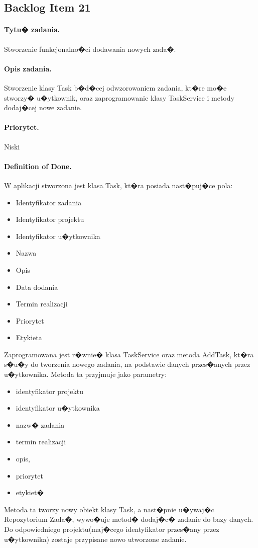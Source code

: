 ﻿\documentclass[a4paper]{article}
\begin{document}
\subsection{Backlog Item 21} 
\paragraph{Tytu� zadania.}  Stworzenie funkcjonalno�ci dodawania nowych zada�.
\paragraph{Opis zadania.} Stworzenie klasy Task b�d�cej odwzorowaniem zadania, kt�re mo�e stworzy� u�ytkownik, oraz zaprogramowanie klasy TaskService i metody dodaj�cej nowe zadanie.
\paragraph{Priorytet.} Niski
\paragraph{Definition of Done.} W aplikacji stworzona jest klasa Task, kt�ra posiada nast�puj�ce pola:
\begin{itemize}
\item Identyfikator zadania
\item Identyfikator projektu
\item Identyfikator u�ytkownika
\item Nazwa
\item Opis
\item Data dodania
\item Termin realizacji
\item Priorytet
\item Etykieta
\end{itemize}
Zaprogramowana jest r�wnie� klasa TaskService oraz metoda AddTask, kt�ra s�u�y do tworzenia nowego zadania, na podstawie danych przes�anych przez u�ytkownika. Metoda ta przyjmuje jako parametry:
\begin{itemize}
\item identyfikator projektu
\item identyfikator u�ytkownika
\item nazw� zadania
\item termin realizacji
\item opis, 
\item priorytet
\item etykiet�
\end{itemize}
Metoda ta tworzy nowy obiekt klasy Task, a nast�pnie u�ywaj�c Repozytorium Zada�, wywo�uje metod� dodaj�c� zadanie do bazy danych. Do odpowiedniego projektu(maj�cego identyfikator przes�any przez u�ytkownika) zostaje przypisane nowo utworzone zadanie.
\end{document}
